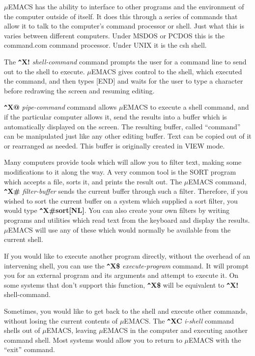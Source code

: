 $\mu$EMACS has the ability to interface to other programs and the
environment of the computer outside of itself. It does this through a
series of commands that allow it to talk to the computer's command
processor or shell. Just what this is varies between different
computers. Under MSDOS or PCDOS this is the command.com command
processor. Under UNIX it is the csh shell.

The {\bf \verb+^+X!} {\it shell-command} command prompts the user for a
command line to send out to the shell to execute. $\mu$EMACS gives control
to the shell, which executed the command, and then types [END] and
waits for the user to type a character before redrawing the screen and
resuming editing.

{\bf \verb+^+X@} {\it pipe-command} command allows $\mu$EMACS to
execute a shell command, and if the particular computer allows it, send
the results into a buffer which is automatically displayed on the
screen. The resulting buffer, called ``command'' can be manipulated
just like any other editing buffer. Text can be copied out of it or
rearranged as needed. This buffer is originally created in VIEW mode.

Many computers provide tools which will allow you to filter text,
making some modifications to it along the way. A very common tool is
the SORT program which accepts a file, sorts it, and prints the result
out. The $\mu$EMACS command, {\bf \verb+^+X\#} {\it filter-buffer} sends
the current buffer through such a filter. Therefore, if you wished to
sort the current buffer on a system which supplied a sort filter, you
would type {\bf \verb+^+X\#sort[NL]}. You can also create your own
filters by writing programs and utilities which read text from the
keyboard and display the results. $\mu$EMACS will use any of these
which would normally be available from the current shell.

If you would like to execute another program directly, without the
overhead of an intervening shell, you can use the {\bf \verb+^+X\$} {\it
execute-program} command. It will prompt you for an external program
and its arguments and attempt to execute it.  On some systems that
don't support this function, {\bf \verb+^+X\$} will be equivalent to
{\bf \verb+^+X!} shell-command.

Sometimes, you would like to get back to the shell and execute other
commands, without losing the current contents of $\mu$EMACS. The {\bf
\verb+^+XC} {\it i-shell} command shells out of $\mu$EMACS, leaving $\mu$EMACS
in the computer and executing another command shell. Most systems would
allow you to return to $\mu$EMACS with the ``exit'' command.

